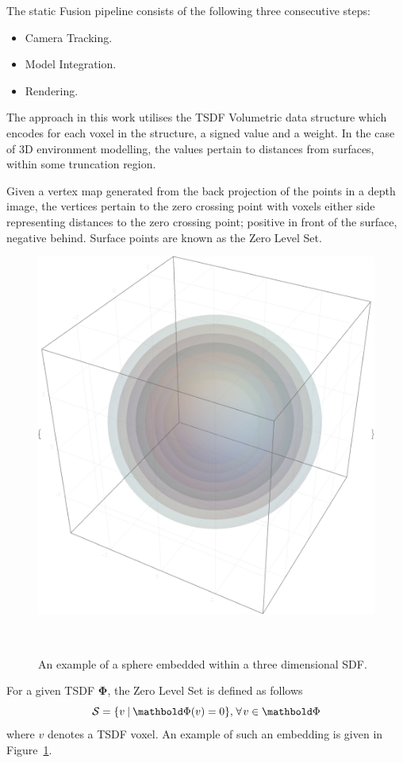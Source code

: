 The static Fusion pipeline consists of the following three consecutive steps:
\begin{itemize}
  \item Camera Tracking.
  \item Model Integration.
  \item Rendering.
\end{itemize}

The approach in this work utilises the TSDF Volumetric data structure which
encodes for each voxel in the structure, a signed value and a weight.
In the case of 3D environment modelling, the values pertain to distances from
surfaces, within some truncation region.

Given a vertex map generated from the back projection of the points in a depth
image, the vertices pertain to the zero crossing point with voxels either side
representing distances to the zero crossing point; positive in front of the
surface, negative behind. Surface points are known as the Zero Level Set.
\begin{figure}[!htbp]
  \centering
  \includegraphics[width=.6\linewidth]{figures/moseg/3d_sdf.eps}
  \caption[Signed Distance Function]{An example of a sphere embedded within a 
  three dimensional SDF.}
~\label{figure:sdf_example}
\end{figure}

For a given TSDF \(\bm{\Phi}\), the Zero Level Set is defined as follows
\begin{equation}
  \label{eqn:zero_level_definition}
  \mathcal{S} = \{v \given \bm{\Phi}(v) = 0\}, 
  \mkern2mu \forall \mkern2mu v \in \bm{\Phi}
\end{equation}
where \(v\) denotes a TSDF voxel. An example of such an embedding is given in
Figure~\ref{figure:sdf_example}.

